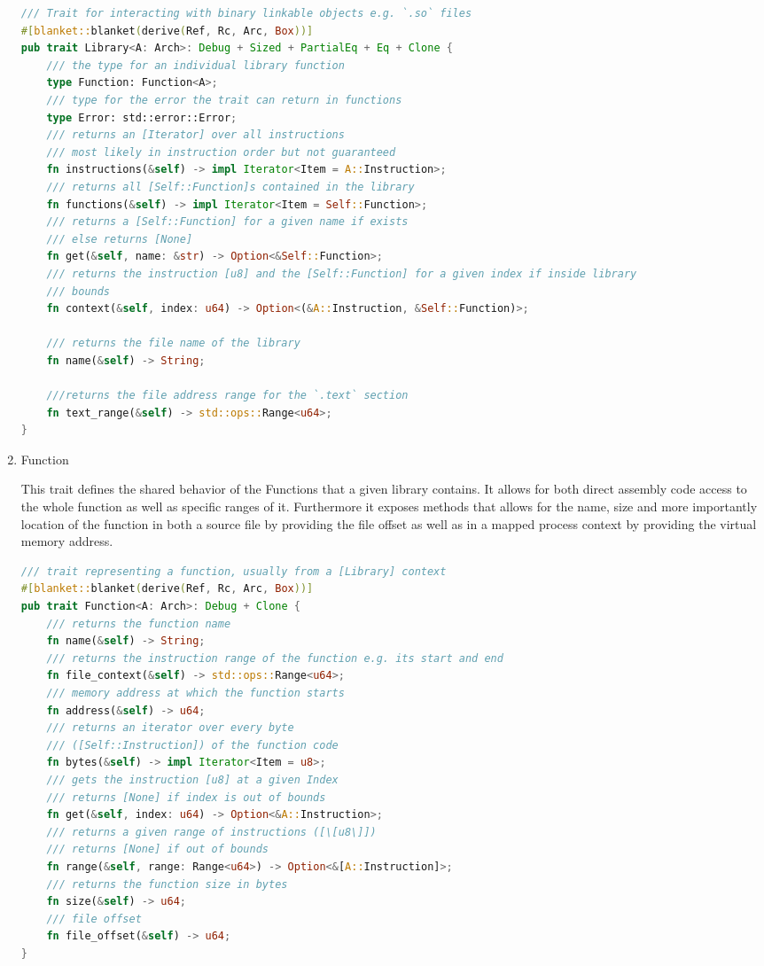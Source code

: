 \begin{enumerate}
\begin{lstlisting}[caption=\label{lst:library}"The Library Trait definition", language=Rust]
/// Trait for interacting with binary linkable objects e.g. `.so` files
#[blanket::blanket(derive(Ref, Rc, Arc, Box))]
pub trait Library<A: Arch>: Debug + Sized + PartialEq + Eq + Clone {
    /// the type for an individual library function
    type Function: Function<A>;
    /// type for the error the trait can return in functions
    type Error: std::error::Error;
    /// returns an [Iterator] over all instructions
    /// most likely in instruction order but not guaranteed
    fn instructions(&self) -> impl Iterator<Item = A::Instruction>;
    /// returns all [Self::Function]s contained in the library
    fn functions(&self) -> impl Iterator<Item = Self::Function>;
    /// returns a [Self::Function] for a given name if exists
    /// else returns [None]
    fn get(&self, name: &str) -> Option<&Self::Function>;
    /// returns the instruction [u8] and the [Self::Function] for a given index if inside library
    /// bounds
    fn context(&self, index: u64) -> Option<(&A::Instruction, &Self::Function)>;

    /// returns the file name of the library
    fn name(&self) -> String;

    ///returns the file address range for the `.text` section
    fn text_range(&self) -> std::ops::Range<u64>;
}
\end{lstlisting}  
    \item \label{reader:function} Function
    
    This trait defines the shared behavior of the Functions that a given library contains.
    It allows for both direct assembly code access to the whole function as well as specific ranges of it.
    Furthermore it exposes methods that allows for the name, size and more importantly location of the function in both a source file by providing the file offset as well as in a mapped process context by providing the virtual memory address.

\begin{lstlisting}[caption=\label{lst:function}"The Function Trait definition", language=Rust]
/// trait representing a function, usually from a [Library] context
#[blanket::blanket(derive(Ref, Rc, Arc, Box))]
pub trait Function<A: Arch>: Debug + Clone {
    /// returns the function name
    fn name(&self) -> String;
    /// returns the instruction range of the function e.g. its start and end
    fn file_context(&self) -> std::ops::Range<u64>;
    /// memory address at which the function starts
    fn address(&self) -> u64;
    /// returns an iterator over every byte 
    /// ([Self::Instruction]) of the function code
    fn bytes(&self) -> impl Iterator<Item = u8>;
    /// gets the instruction [u8] at a given Index
    /// returns [None] if index is out of bounds
    fn get(&self, index: u64) -> Option<&A::Instruction>;
    /// returns a given range of instructions ([\[u8\]])
    /// returns [None] if out of bounds
    fn range(&self, range: Range<u64>) -> Option<&[A::Instruction]>;
    /// returns the function size in bytes
    fn size(&self) -> u64;
    /// file offset
    fn file_offset(&self) -> u64;
}
\end{lstlisting}
    

\end{enumerate}

